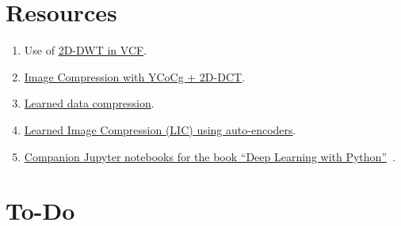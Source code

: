 \section{Resources}

\begin{enumerate}
\item Use of \href{https://github.com/Sistemas-Multimedia/VCF/blob/main/src/DWT.py}{2D-DWT in VCF}.
\item
  \href{https://github.com/vicente-gonzalez-ruiz/DCT2D/blob/master/src/DCT2D/YCoCg_2D_DCT_SQ.ipynb}{Image
    Compression with YCoCg + 2D-DCT}.
\item
  \href{https://www.tensorflow.org/tutorials/generative/data_compression}{Learned
    data compression}.
\item
  \href{https://github.com/vicente-gonzalez-ruiz/learned_image_compression/blob/main/LIC.ipynb}{Learned
    Image Compression (LIC) using auto-encoders}.
\item
  \href{https://github.com/fchollet/deep-learning-with-python-notebooks}{Companion
    Jupyter notebooks for the book ``Deep Learning with
    Python''}~\cite{chollet2021deep}.
\end{enumerate}


\section{To-Do}

